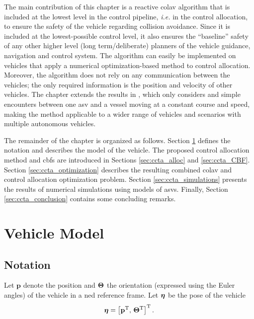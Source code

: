 The main contribution of this chapter is a reactive \acrfull{colav} algorithm that is included at the lowest level in the control pipeline, \emph{i.e.} in the control allocation, to ensure the safety of the vehicle regarding collision avoidance.
Since it is included at the lowest-possible control level, it also ensures the ``baseline'' safety of any other higher level (long term/deliberate) planners of the vehicle guidance, navigation and control system.
The algorithm can easily be implemented on vehicles that apply a numerical optimization-based method to control allocation.
Moreover, the algorithm does not rely on any communication between the vehicles; the only required information is the position and velocity of other vehicles.
The chapter extends the results in \cite{thyri_reactive_2020}, which only considers  and simple encounters between one \gls{asv} and a vessel moving at a constant course and speed, making the method applicable to a wider range of vehicles and scenarios with multiple autonomous vehicles.

The remainder of the chapter is organized as follows.
Section \ref{sec:ccta_model} defines the notation and describes the model of the vehicle.
The proposed control allocation method and \glspl{cbf} are introduced in Sections \ref{sec:ccta_alloc} and \ref{sec:ccta_CBF}.
Section \ref{sec:ccta_optimization} describes the resulting combined \gls{colav} and control allocation optimization problem.
Section \ref{sec:ccta_simulations} presents the results of numerical simulations using models of \glspl{asv}.
Finally, Section \ref{sec:ccta_conclusion} contains some concluding remarks.

\section{Vehicle Model}
\label{sec:ccta_model}

\subsection{Notation}
\label{sec:ccta_notation}

Let $\mathbf{p}$ denote the position and $\bm{\Theta}$ the orientation (expressed using the Euler angles) of the vehicle in a \acrfull{ned} reference frame.
%
Let $\bm{\eta}$ be the pose of the vehicle
\begin{equation}
    \bm{\eta} = \left[ \mathbf{p}^{\rm T} ,\, \bm{\Theta}^{\rm T} \right]^{\rm T}.
\end{equation}

